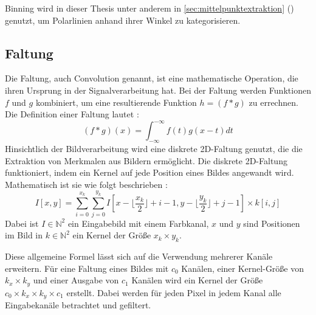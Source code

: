 Binning wird in dieser Thesis unter anderem in \autoref{sec:mittelpunktextraktion} () genutzt, um Polarlinien anhand ihrer Winkel zu kategorisieren.


\subsection{Faltung}
\label{sec:was_filterung}

Die Faltung, auch Convolution genannt, ist eine mathematische Operation, die ihren Ursprung in der Signalverarbeitung hat. Bei der Faltung werden Funktionen $f$ und $g$ kombiniert, um eine resultierende Funktion $h = (f * g)$ zu errechnen. Die Definition einer Faltung lautet \cite{convolution,cv_general}:
\[ (f*g)(x) = \int_{-\infty}^{-\infty} f(t) g(x-t) dt\]
Hinsichtlich der Bildverarbeitung wird eine diskrete 2D-Faltung genutzt, die die Extraktion von Merkmalen aus Bildern ermöglicht. Die diskrete 2D-Faltung funktioniert, indem ein Kernel auf jede Position eines Bildes angewandt wird. Mathematisch ist sie wie folgt beschrieben \cite{discrete_convolution}:
\[ I[x, y] = \sum_{i=0}^{x_k} \sum_{j=0}^{y_k} I[x - \lfloor\frac{x_k}{2}\rfloor + i - 1, y - \lfloor \frac{y_k}{2} \rfloor + j - 1] \times k[i, j] \]
Dabei ist $I \in \mathbb{N}^2$ ein Eingabebild mit einem Farbkanal, $x$ und $y$ sind Positionen im Bild in $k \in \mathbb{N}^2$ ein Kernel der Größe $x_k \times y_k$.

Diese allgemeine Formel lässt sich auf die Verwendung mehrerer Kanäle erweitern. Für eine Faltung eines Bildes mit $c_0$ Kanälen, einer Kernel-Größe von $k_x \times k_y$ und einer Ausgabe von $c_1$ Kanälen wird ein Kernel der Größe $ c_0 \times k_x \times k_y \times c_1$ erstellt. Dabei werden für jeden Pixel in jedem Kanal alle Eingabekanäle betrachtet und gefiltert.



